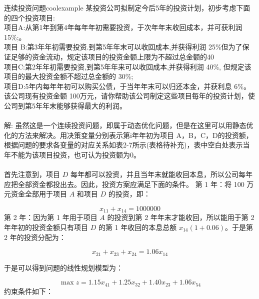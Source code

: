         \begin{exbox}{连续投资问题}{coolexample}
            某投资公司拟制定今后5年的投资计划，初步考虑下面的四个投资项目:
            \\项目A:从第1年到第4年每年年初需要投资，于次年年末收回成本，并可获利润 15\%;。
            \\项目 B:第3年年初需要投资.到第5年年末可以收回成本,并获得利润 25\%但为了保证足够的资金流动，规定该项目的投资金额上限为不超过总金额的40%
            \\项目C:第2年年初需要投资,到第5年年来可以收回成本,并获得利润 40\%,
            但规定该项目的最大投资金额不超过总金额的 30\%;
            \\项目D:5年内每年年初可以购买公债，于当年年末可以归还本金，并获利息 6\%。
            \\该公司现有投资金额 100万元，请你帮助该公司制定这些项目每年的投资计划，使公司到第5年年末能够获得最大的利润。
            \\
            \\
            解:
            虽然这是一个连续投资问题，即属于动态优化问题，但是在这里可以用静态优化的方法来解决。用决策变量分别表示第i年年初为项目 A，B，C，D的投资额，根据问题的要求各变量的对应关系如表2-7所示(表格待补充)，表中空白处表示当年不能为该项目投资，也可认为投资额为0。\\
            \\
            首先注意到，项目 \(D\) 每年都可以投资，并且当年末就能收回本息，所以公司每年应把全部资金都投出去。因此，投资方案应满足下面的条件。
            第 1 年：将 100 万元资金全部用于项目 \(A\) 和项目 \(D\) 的投资，即：

            \[
            x_{11} + x_{14} = 1000000
            \]
            第 2 年：因为第 1 年用于项目 \(A\) 的投资到第 2 年年末才能收回，所以能用于第 2 年年初的投资金额只有项目 \(D\) 的第 1 年收回的本息总额 \(x_{14}(1 + 0.06)\)。于是第 2 年的投资分配为：

            \[
            x_{21} + x_{23} + x_{24} = 1.06 x_{14}
            \]

            于是可以得到问题的线性规划模型为：

            \[
            \max z = 1.15 x_{41} + 1.25 x_{32} + 1.40 x_{23} + 1.06 x_{54}
            \]
            约束条件如下：


\end{exbox}
